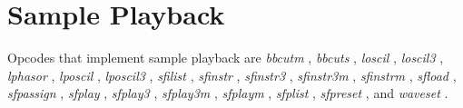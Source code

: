 \begin{comment}
\documentclass[10pt]{article}
\usepackage{fullpage, graphicx, url}
\setlength{\parskip}{1ex}
\setlength{\parindent}{0ex}
\title{Sample Playback}



\begin{tabular}{ccc}
The Alternative Csound Reference Manual & & \\
Previous &Signal Generators &Next

\end{tabular}

\end{comment}
\section{Sample Playback}


  Opcodes that implement sample playback are \emph{bbcutm}
, \emph{bbcuts}
, \emph{loscil}
, \emph{loscil3}
, \emph{lphasor}
, \emph{lposcil}
, \emph{lposcil3}
, \emph{sfilist}
, \emph{sfinstr}
, \emph{sfinstr3}
, \emph{sfinstr3m}
, \emph{sfinstrm}
, \emph{sfload}
, \emph{sfpassign}
, \emph{sfplay}
, \emph{sfplay3}
, \emph{sfplay3m}
, \emph{sfplaym}
, \emph{sfplist}
, \emph{sfpreset}
, and \emph{waveset}
. 


\begin{comment}
\begin{tabular}{lcr}
Previous &Home &Next \\
Random (Noise) Generators &Up &Scanned Synthesis

\end{tabular}



\end{comment}
